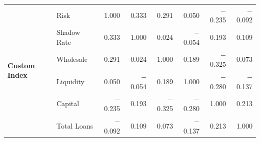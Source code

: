 \documentclass[12pt,a4paper]{report}
\begin{document}
\begin{table}[H]
{\begin{tabular}{ll rrrrrr}
\multirow{6}{*}{\textbf{Custom Index}}
 & Risk          &  1.000 &  0.333 &  0.291 &  0.050 & $-$0.235 & $-$0.092 \\
 & Shadow Rate   &  0.333 &  1.000 &  0.024 & $-$0.054 &  0.193 &  0.109 \\
 & Wholesale     &  0.291 &  0.024 &  1.000 &  0.189 & $-$0.325 &  0.073 \\
 & Liquidity     &  0.050 & $-$0.054 &  0.189 &  1.000 & $-$0.280 & $-$0.137 \\
 & Capital       & $-$0.235 &  0.193 & $-$0.325 & $-$0.280 &  1.000 &  0.213 \\
 & Total Loans   & $-$0.092 &  0.109 &  0.073 & $-$0.137 &  0.213 &  1.000 \\

\bottomrule
\end{tabular}%
}
\end{table}
\end{document}
